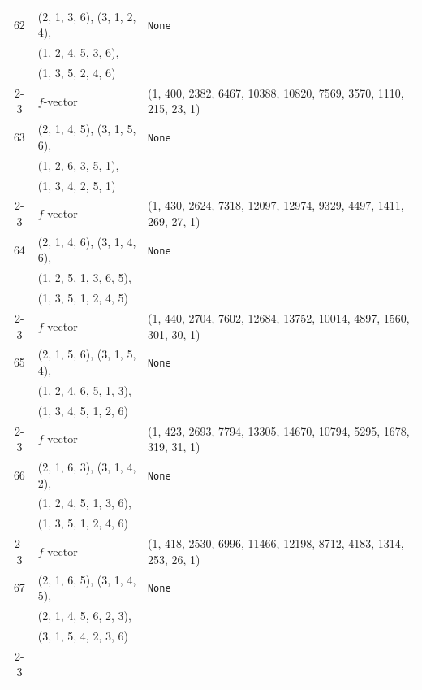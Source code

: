 \documentclass[10pt]{amsart}
\numberwithin{equation}{section}
\theoremstyle{plain}
\theoremstyle{definition}
\theoremstyle{remark}
\begin{document}
{\begin{longtable}{c|l|l}
		62 & (2, 1, 3, 6), (3, 1, 2, 4), & \texttt{None} \\
		& (1, 2, 4, 5, 3, 6), &  \\
		& (1, 3, 5, 2, 4, 6) &  \\ \cline{2-3}
		
		& $f$-vector & {(1, 400, 2382, 6467, 10388, 10820, 7569, 3570, 1110, 215, 23, 1)} \\
		\midrule
		
		63 & (2, 1, 4, 5), (3, 1, 5, 6), & \texttt{None} \\
		& (1, 2, 6, 3, 5, 1), &  \\
		& (1, 3, 4, 2, 5, 1) &  \\ \cline{2-3}
		
		& $f$-vector & {(1, 430, 2624, 7318, 12097, 12974, 9329, 4497, 1411, 269, 27, 1)} \\
		\midrule
		
		64 & (2, 1, 4, 6), (3, 1, 4, 6), & \texttt{None} \\
		& (1, 2, 5, 1, 3, 6, 5), &  \\
		& (1, 3, 5, 1, 2, 4, 5) &  \\ \cline{2-3}
		
		& $f$-vector & {(1, 440, 2704, 7602, 12684, 13752, 10014, 4897, 1560, 301, 30, 1)} \\
		\midrule
		
		65 & (2, 1, 5, 6), (3, 1, 5, 4), & \texttt{None} \\
		& (1, 2, 4, 6, 5, 1, 3), &  \\
		& (1, 3, 4, 5, 1, 2, 6) &  \\ \cline{2-3}
		
		& $f$-vector & {(1, 423, 2693, 7794, 13305, 14670, 10794, 5295, 1678, 319, 31, 1)} \\
		\midrule
		
		66 & (2, 1, 6, 3), (3, 1, 4, 2), & \texttt{None} \\
		& (1, 2, 4, 5, 1, 3, 6), &  \\
		& (1, 3, 5, 1, 2, 4, 6) &  \\ \cline{2-3}
		
		& $f$-vector & {(1, 418, 2530, 6996, 11466, 12198, 8712, 4183, 1314, 253, 26, 1)} \\
		\midrule
		
		67 & (2, 1, 6, 5), (3, 1, 4, 5), & \texttt{None} \\
		& (2, 1, 4, 5, 6, 2, 3), &  \\
		& (3, 1, 5, 4, 2, 3, 6) &  \\ \cline{2-3}
		

\end{longtable}}
\end{document}

